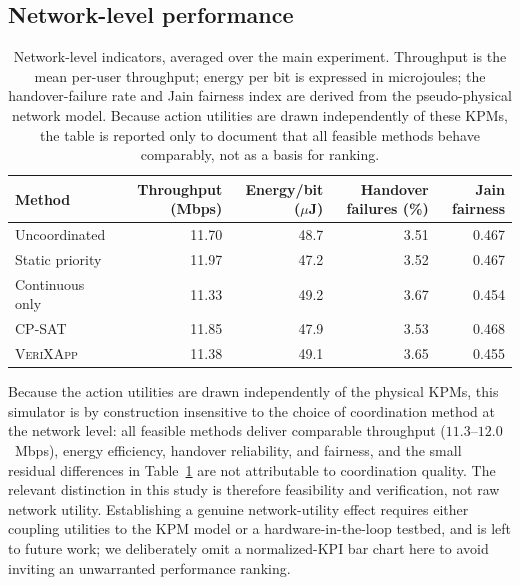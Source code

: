 \documentclass[pdflatex,sn-mathphys-num,iicol,oneside]{sn-jnl}
\newcommand{\method}{\textsc{VeriXApp}}
\begin{document}
\subsection{Network-level performance}
\label{sec:network-perf}

\begin{table}[t]
\centering
\caption{Network-level indicators, averaged over the main experiment.
Throughput is the mean per-user throughput; energy per bit is
expressed in microjoules; the handover-failure rate and Jain fairness
index are derived from the pseudo-physical network model. Because
action utilities are drawn independently of these KPMs, the table is
reported only to document that all feasible methods behave comparably,
not as a basis for ranking.}
\label{tab:network-results}
\begin{tabular}{
l
r
r
r
r
}
\toprule
Method &
{Throughput (Mbps)} &
{Energy/bit ($\mu$J)} &
{Handover failures (\%)} &
{Jain fairness}\\
\midrule
Uncoordinated &
{11.70} & {48.7} & {3.51} & {0.467}\\

Static priority &
{11.97} & {47.2} & {3.52} & {0.467}\\

Continuous only &
{11.33} & {49.2} & {3.67} & {0.454}\\

CP-SAT &
{11.85} & {47.9} & {3.53} & {0.468}\\

\method &
{11.38} & {49.1} & {3.65} & {0.455}\\

\bottomrule
\end{tabular}
\end{table}

Because the action utilities are drawn independently of the physical
KPMs, this simulator is by construction insensitive to the choice of
coordination method at the network level: all feasible methods deliver
comparable throughput ($11.3$--$12.0$~Mbps), energy efficiency,
handover reliability, and fairness, and the small residual differences
in Table~\ref{tab:network-results} are not attributable to
coordination quality. The relevant distinction in this study is
therefore feasibility and verification, not raw network utility.
Establishing a genuine network-utility effect requires either coupling
utilities to the KPM model or a hardware-in-the-loop testbed, and is
left to future work; we deliberately omit a normalized-KPI bar chart
here to avoid inviting an unwarranted performance ranking.
\end{document}
